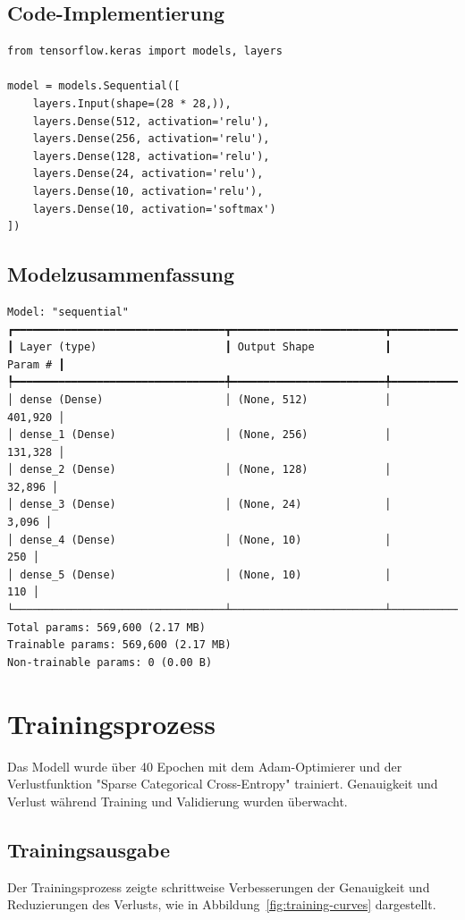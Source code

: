 \documentclass[12pt,a4paper]{article}
\begin{document}
\subsection*{Code-Implementierung}
\begin{lstlisting}
from tensorflow.keras import models, layers

model = models.Sequential([
    layers.Input(shape=(28 * 28,)),
    layers.Dense(512, activation='relu'),
    layers.Dense(256, activation='relu'),
    layers.Dense(128, activation='relu'),
    layers.Dense(24, activation='relu'),
    layers.Dense(10, activation='relu'),
    layers.Dense(10, activation='softmax')
])
\end{lstlisting}

\subsection*{Modelzusammenfassung}
\begin{verbatim}
Model: "sequential"
┏━━━━━━━━━━━━━━━━━━━━━━━━━━━━━━━━━┳━━━━━━━━━━━━━━━━━━━━━━━━┳━━━━━━━━━━━━━━━┓
┃ Layer (type)                    ┃ Output Shape           ┃       Param # ┃
┡━━━━━━━━━━━━━━━━━━━━━━━━━━━━━━━━━╇━━━━━━━━━━━━━━━━━━━━━━━━╇━━━━━━━━━━━━━━━┩
│ dense (Dense)                   │ (None, 512)            │       401,920 │
│ dense_1 (Dense)                 │ (None, 256)            │       131,328 │
│ dense_2 (Dense)                 │ (None, 128)            │        32,896 │
│ dense_3 (Dense)                 │ (None, 24)             │         3,096 │
│ dense_4 (Dense)                 │ (None, 10)             │           250 │
│ dense_5 (Dense)                 │ (None, 10)             │           110 │
└─────────────────────────────────┴────────────────────────┴───────────────┘
Total params: 569,600 (2.17 MB)
Trainable params: 569,600 (2.17 MB)
Non-trainable params: 0 (0.00 B)
\end{verbatim}

\section*{Trainingsprozess}
Das Modell wurde über 40 Epochen mit dem Adam-Optimierer und der Verlustfunktion "Sparse Categorical Cross-Entropy" trainiert. Genauigkeit und Verlust während Training und Validierung wurden überwacht.

\subsection*{Trainingsausgabe}
Der Trainingsprozess zeigte schrittweise Verbesserungen der Genauigkeit und Reduzierungen des Verlusts, wie in Abbildung~\ref{fig:training-curves} dargestellt.
\end{document}
